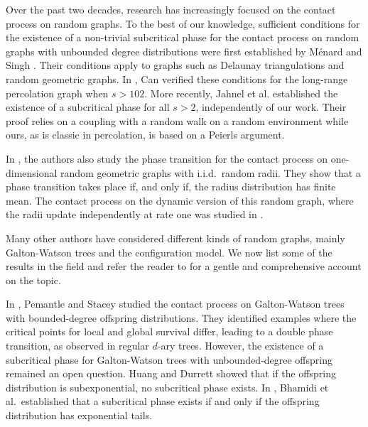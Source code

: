 \documentclass[a4paper,oneside,12pt]{amsart}
\theoremstyle{plain}
\theoremstyle{definition}
\theoremstyle{remark}
\begin{document}
Over the past two decades, research has increasingly focused on the contact process on random graphs.
To the best of our knowledge, sufficient conditions for the existence of a non-trivial subcritical phase for the contact process on random graphs with unbounded degree distributions were first established by Ménard and Singh \cite{Menard_16}. Their conditions apply to graphs such as Delaunay triangulations and random geometric graphs. 
In \cite{HaoCan_15}, Can verified these conditions for the long-range percolation graph when $s>102$. 
More recently, Jahnel et al. \cite{Jahnel25} established the existence of a subcritical phase for all $s>2$, independently of our work.
Their proof relies on a coupling with a random walk on a random environment while ours, as is classic in percolation, is based on a Peierls argument.

In \cite{Jahnel25}, the authors also study the phase transition for the contact process on one-dimen\-sional random geometric graphs with i.i.d.\ random radii.
They show that a phase transition takes place if, and only if, the radius distribution has finite mean. The contact process on the dynamic version of this random graph, where the radii update independently at rate one was studied in \cite{GL2022}.

Many other authors have considered different kinds of random graphs, mainly Galton-Watson trees and the configuration model.
We now list some of the results in the field and refer the reader to \cite{Valesin2024} for a gentle and comprehensive account on the topic.

In \cite{Pemantle01}, Pemantle and Stacey studied the contact process on Galton-Watson trees with bounded-degree offspring distributions. 
They identified examples where the critical points for local and global survival differ, leading to a double phase transition, as observed in regular $d$-ary trees. 
However, the existence of a subcritical phase for Galton-Watson trees with unbounded-degree offspring remained an open question.
Huang and Durrett \cite{Huang2020} showed that if the offspring distribution is subexponential, no subcritical phase exists.
In \cite{Bhamidi2021}, Bhamidi et al.\ established that a subcritical phase exists if and only if the offspring distribution has exponential tails.
\end{document}
